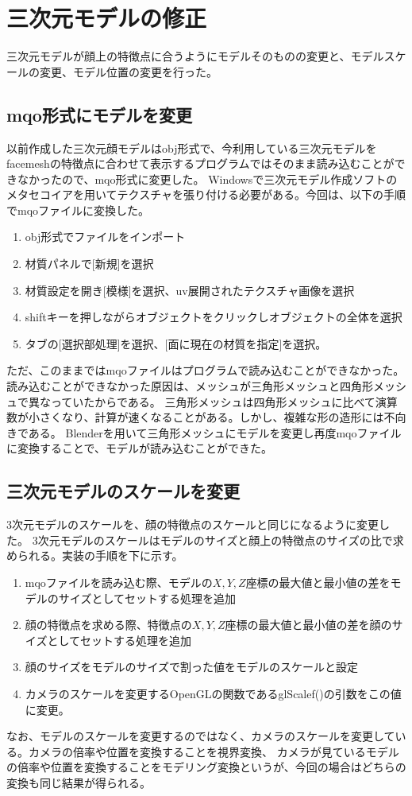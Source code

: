 \documentclass[]{jarticle}          %
\begin{document}
\section{三次元モデルの修正}
三次元モデルが顔上の特徴点に合うようにモデルそのものの変更と、モデルスケールの変更、モデル位置の変更を行った。

\subsection{mqo形式にモデルを変更}
以前作成した三次元顔モデルはobj形式で、今利用している三次元モデルをfacemeshの特徴点に合わせて表示するプログラムではそのまま読み込むことができなかったので、mqo形式に変更した。
Windowsで三次元モデル作成ソフトのメタセコイアを用いてテクスチャを張り付ける必要がある。今回は、以下の手順でmqoファイルに変換した。
\begin{enumerate}
  \item obj形式でファイルをインポート
  \item 材質パネルで[新規]を選択
  \item 材質設定を開き[模様]を選択、uv展開されたテクスチャ画像を選択
  \item shiftキーを押しながらオブジェクトをクリックしオブジェクトの全体を選択
  \item タブの[選択部処理]を選択、[面に現在の材質を指定]を選択。
\end{enumerate}
ただ、このままではmqoファイルはプログラムで読み込むことができなかった。読み込むことができなかった原因は、メッシュが三角形メッシュと四角形メッシュで異なっていたからである。
三角形メッシュは四角形メッシュに比べて演算数が小さくなり、計算が速くなることがある。しかし、複雑な形の造形には不向きである。
Blenderを用いて三角形メッシュにモデルを変更し再度mqoファイルに変換することで、モデルが読み込むことができた。

\subsection{三次元モデルのスケールを変更}
3次元モデルのスケールを、顔の特徴点のスケールと同じになるように変更した。
3次元モデルのスケールはモデルのサイズと顔上の特徴点のサイズの比で求められる。実装の手順を下に示す。
\begin{enumerate}
  \item mqoファイルを読み込む際、モデルの$X,Y,Z$座標の最大値と最小値の差をモデルのサイズとしてセットする処理を追加
  \item 顔の特徴点を求める際、特徴点の$X,Y,Z$座標の最大値と最小値の差を顔のサイズとしてセットする処理を追加
  \item 顔のサイズをモデルのサイズで割った値をモデルのスケールと設定
  \item カメラのスケールを変更するOpenGLの関数であるglScalef()の引数をこの値に変更。
\end{enumerate}
なお、モデルのスケールを変更するのではなく、カメラのスケールを変更している。カメラの倍率や位置を変換することを視界変換、
カメラが見ているモデルの倍率や位置を変換することをモデリング変換というが、今回の場合はどちらの変換も同じ結果が得られる\cite{bib_1}。
\end{document}

